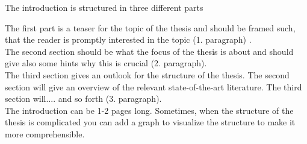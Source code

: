The introduction is structured in three different parts

The first part is a teaser for the topic of the thesis and should be framed such, that the reader is promptly interested in the topic (1. paragraph) . \\

The second section should be what the focus of the thesis is about and should give also some hints why this is crucial (2. paragraph). \\

The third section gives an outlook for the structure of the thesis. The second section will give an overview of the relevant state-of-the-art literature. The third section will.... and so forth (3. paragraph). \\

The introduction can be 1-2 pages long. 
Sometimes, when the structure of the thesis is complicated you can add a graph to visualize the structure to make it more comprehensible. 


